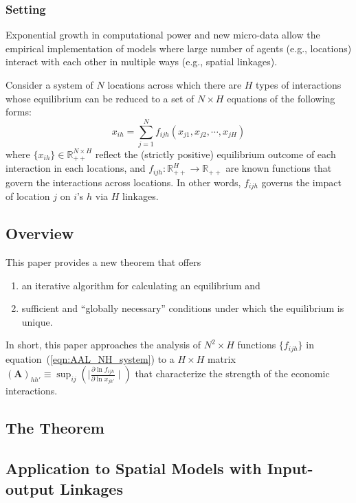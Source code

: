 \subsubsection{Setting}
Exponential growth in computational power and new micro-data allow
the empirical implementation of models where large number of agents (e.g., locations) interact 
with each other in multiple ways (e.g., spatial linkages).

Consider a system of $N$ locations across which there are $H$ types of interactions whose equilibrium 
can be reduced to a set of $N \times H$ equations of the following forms:
\begin{equation}
    \label{eqn:AAL_NH_system}
    x_{ih} = \sum_{j = 1}^N f_{ijh}(x_{j1}, x_{j2}, \cdots, x_{jH})
\end{equation}
where $\{ x_{ih}\} \in \mathbb{R}_{++}^{N \times H}$ reflect the (strictly positive) equilibrium outcome
of each interaction in each locations,
and $f_{ijh}: \mathbb{R}_{++}^{H} \rightarrow \mathbb{R}_{++}$ are known functions that govern the interactions across locations.
In other words, $f_{ijh}$ governs the impact of location $j$ on $i$'s $h$ via $H$ linkages.

\subsection{Overview}
This paper provides a new theorem that offers
\begin{enumerate}
    \item an iterative algorithm for calculating an equilibrium and 
    \item sufficient and “globally necessary” conditions under which the equilibrium is unique.
\end{enumerate}
In short, this paper approaches the analysis of $N^2 \times H$ functions $\{ f_{ijh} \}$ in equation~(\ref{eqn:AAL_NH_system})
to a $H \times H$ matrix $(\mathbf{A})_{hh'} \equiv \sup_{ij} \left( \mid \frac{\partial \ln f_{ijh}}{\partial \ln x_{jh'}} \mid \right)$
that characterize the strength of the economic interactions.

\subsection{The Theorem}


\subsection{Application to Spatial Models with Input-output Linkages}
